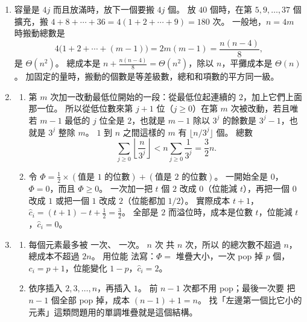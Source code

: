 \begin{enumerate}
\item 容量是 $4j$ 而且放滿時，放下一個要搬 $4j$ 個。 放 $40$ 個時，在第
$5, 9, \ldots, 37$ 個擴充，搬 $4 + 8 + \cdots + 36 = 4(1 + 2 + \cdots + 9) = 180$
次。 一般地，$n = 4m$ 時搬動總數是
\[
4 \bigl(1 + 2 + \cdots + (m - 1)\bigr) = 2m(m - 1) = \frac{n(n - 4)}{8},
\]
是 $\Theta(n^2)$。 總成本是 $n + \frac{n(n-4)}{8} = \Theta(n^2)$，除以 $n$，平攤成本是
$\Theta(n)$。 加固定的量時，搬動的個數是等差級數，總和和項數的平方同一級。

\item
\begin{enumerate}
\item 第 $m$ 次加一改動最低位開始的一段：從最低位起連續的 $2$，加上它們上面那一位。
所以從低位數來第 $j + 1$ 位（$j \ge 0$）在第 $m$ 次被改動，若且唯若 $m - 1$ 最低的
$j$ 位全是 $2$，也就是 $m - 1$ 除以 $3^j$ 的餘數是 $3^j - 1$，也就是 $3^j$ 整除 $m$。
$1$ 到 $n$ 之間這樣的 $m$ 有 $\lfloor n/3^j \rfloor$ 個。 總數
\[
\sum_{j \ge 0} \left\lfloor \frac{n}{3^j} \right\rfloor
< n \sum_{j \ge 0} \frac{1}{3^j} = \frac{3}{2} n.
\]
\item 令 $\Phi = \frac{1}{2} \times (\text{值是 } 1 \text{ 的位數}) + (\text{值是 } 2
\text{ 的位數})$。 一開始全是 $0$，$\Phi = 0$，而且 $\Phi \ge 0$。 一次加一把 $t$
個 $2$ 改成 $0$（位能減 $t$），再把一個 $0$ 改成 $1$ 或把一個 $1$ 改成 $2$（位能都加
$1/2$）。 實際成本 $t + 1$，$\hat{c}_i = (t + 1) - t + \frac{1}{2} = \frac{3}{2}$。
全部是 $2$ 而溢位時，成本是位數 $t$，位能減 $t$，$\hat{c}_i = 0$。
\end{enumerate}

\item
\begin{enumerate}
\item 每個元素最多被  一次、 一次。 $n$ 次  共
 $n$ 次，所以  的總次數不超過 $n$，總成本不超過 $2n$。 用位能
法寫：$\Phi = $ 堆疊大小，一次  pop 掉 $p$ 個，$c_i = p + 1$，位能變化
$1 - p$，$\hat{c}_i = 2$。
\item 依序插入 $2, 3, \ldots, n$，再插入 $1$。 前 $n - 1$ 次都不用 pop；最後一次要
把 $n - 1$ 個全部 pop 掉，成本 $(n - 1) + 1 = n$。 找「左邊第一個比它小的元素」這類問題用的單調堆疊就是這個結構。
\end{enumerate}


\end{enumerate}
